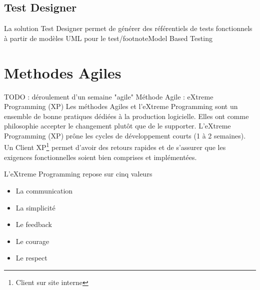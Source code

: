 \documentclass[12pt,oneside]{book}
\begin{document}
\chapter{Test Designer}
La solution Test Designer permet de générer des référentiels de tests fonctionnels à partir de modèles UML pour le test/footnote{Model Based Testing}
\part{Methodes Agiles}
TODO : déroulement d'un semaine "agile"
Méthode Agile : eXtreme Programming  (XP)
Les méthodes Agiles et l'eXtreme Programming sont un ensemble de bonne pratiques dédiées à la production logicielle. Elles ont comme philosophie accepter le changement plutôt que de le supporter. L'eXtreme Programming (XP) pr\^one les cycles de développement courts (1 à 2 semaines). Un Client XP\footnote{Client sur site interne} permet d'avoir des retours rapides et de s'assurer que les exigences fonctionnelles soient bien comprises et implémentées.

L'eXtreme Programming repose sur cinq valeurs
\begin{itemize}
\item{La communication}
\item{La simplicité}
\item{Le feedback}
\item{Le courage}
\item{Le respect}
\end{itemize}
\end{document}
